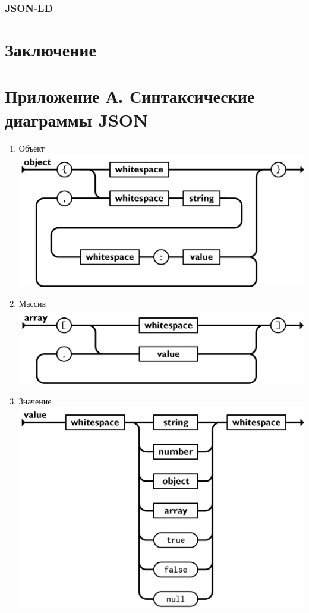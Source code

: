 \documentclass[a4page]{article}
\begin{document}
\subsubsection{JSON-LD}

\newpage
\section{Заключение}

\newpage
{}
\section*{Приложение А. Синтаксические диаграммы JSON} \label{appendix}
\begin{enumerate}
	\item Объект \\
	      \includegraphics[scale=0.6]{object.png}
	\item Массив \\
	      \includegraphics[scale=0.6]{array.png}
	\item Значение \\
	      \includegraphics[scale=0.6]{value.png}

\end{enumerate}
\end{document}
